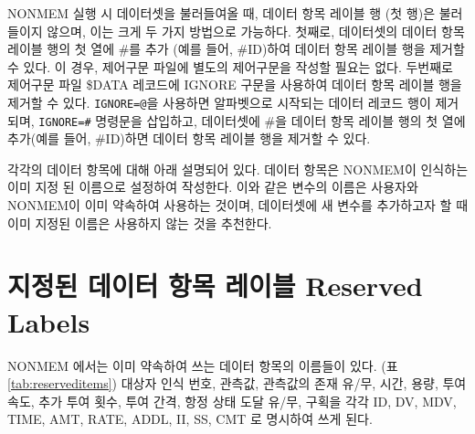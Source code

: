 \documentclass[
  11pt,
  krantz2, a4paper, twoside]{krantz}
\theoremstyle{definition}
\theoremstyle{definition}
\theoremstyle{definition}
\theoremstyle{remark}
\begin{document}
NONMEM 실행 시 데이터셋을 불러들여올 때, 데이터 항목 레이블 행 (첫 행)은 불러들이지 않으며, 이는 크게 두 가지 방법으로 가능하다. 첫째로, 데이터셋의 데이터 항목 레이블 행의 첫 열에 \#를 추가 (예를 들어, \#ID)하여 데이터 항목 레이블 행을 제거할 수 있다. 이 경우, 제어구문 파일에 별도의 제어구문을 작성할 필요는 없다. 두번째로 제어구문 파일 \$DATA 레코드에 IGNORE 구문을 사용하여 데이터 항목 레이블 행을 제거할 수 있다. \texttt{IGNORE=@}을 사용하면 알파벳으로 시작되는 데이터 레코드 행이 제거되며, \texttt{IGNORE=\#} 명령문을 삽입하고, 데이터셋에 \#을 데이터 항목 레이블 행의 첫 열에 추가(예를 들어, \#ID)하면 데이터 항목 레이블 행을 제거할 수 있다.

각각의 데이터 항목에 대해 아래 설명되어 있다. 데이터 항목은 NONMEM이 인식하는 이미 지정 된 이름으로 설정하여 작성한다. 이와 같은 변수의 이름은 사용자와 NONMEM이 이미 약속하여 사용하는 것이며, 데이터셋에 새 변수를 추가하고자 할 때 이미 지정된 이름은 사용하지 않는 것을 추천한다.

\hypertarget{uxc9c0uxc815uxb41c-uxb370uxc774uxd130-uxd56duxbaa9-uxb808uxc774uxbe14-reserved-labels}{%
\section{지정된 데이터 항목 레이블 Reserved Labels}\label{uxc9c0uxc815uxb41c-uxb370uxc774uxd130-uxd56duxbaa9-uxb808uxc774uxbe14-reserved-labels}}

NONMEM 에서는 이미 약속하여 쓰는 데이터 항목의 이름들이 있다. (표 \ref{tab:reserveditems}) 대상자 인식 번호, 관측값, 관측값의 존재 유/무, 시간, 용량, 투여속도, 추가 투여 횟수, 투여 간격, 항정 상태 도달 유/무, 구획을 각각 ID, DV, MDV, TIME, AMT, RATE, ADDL, II, SS, CMT 로 명시하여 쓰게 된다.
\end{document}
